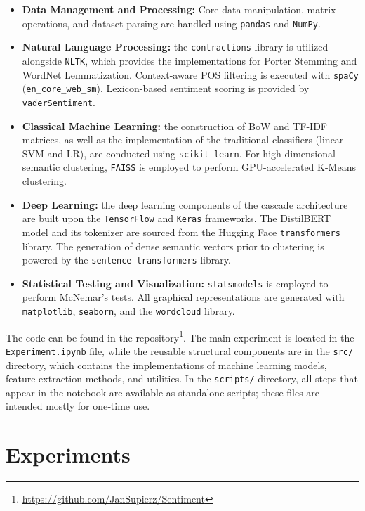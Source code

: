 \documentclass[a4paper,twoside,12pt]{book}
\newcommand{\logreg}{LR}
\newcommand{\code}[1]{\texttt{#1}}
\begin{document}
\begin{itemize}
	\item \textbf{Data Management and Processing:} Core data manipulation, matrix operations, and dataset parsing are handled using \code{pandas} and \code{NumPy}.
	
	\item \textbf{Natural Language Processing:} the \code{contractions} library is utilized alongside \code{NLTK}, which provides the implementations for Porter Stemming and WordNet Lemmatization. Context-aware POS filtering is executed with \code{spaCy} (\texttt{en\_core\_web\_sm}). Lexicon-based sentiment scoring is provided by \code{vaderSentiment}.
	
	\item \textbf{Classical Machine Learning:} the construction of BoW and TF-IDF matrices, as well as the implementation of the traditional classifiers (linear SVM and \logreg), are conducted using \code{scikit-learn}. For high-dimensional semantic clustering, \code{FAISS} is employed to perform GPU-accelerated K-Means clustering.
	
	\item \textbf{Deep Learning:} the deep learning components of the cascade architecture are built upon the \code{TensorFlow} and \code{Keras} frameworks. The DistilBERT model and its tokenizer are sourced from the Hugging Face \code{transformers} library. The generation of dense semantic vectors prior to clustering is powered by the \code{sentence-transformers} library.
	
	\item \textbf{Statistical Testing and Visualization:} \code{statsmodels} is employed to perform McNemar's tests. All graphical representations are generated with \code{matplotlib}, \code{seaborn}, and the \code{wordcloud} library.
\end{itemize}

The code can be found in the repository\footnote{\url{https://github.com/JanSupierz/Sentiment}}.
The main experiment is located in the \code{Experiment.ipynb} file, while the reusable structural components are in the \code{src/} directory, which contains the implementations of machine learning models, feature extraction methods, and utilities.
In the \code{scripts/} directory, all steps that appear in the notebook are available as standalone scripts; these files are intended mostly for one‑time use.
\chapter{Experiments} \label{chap:experiments}
\end{document}
